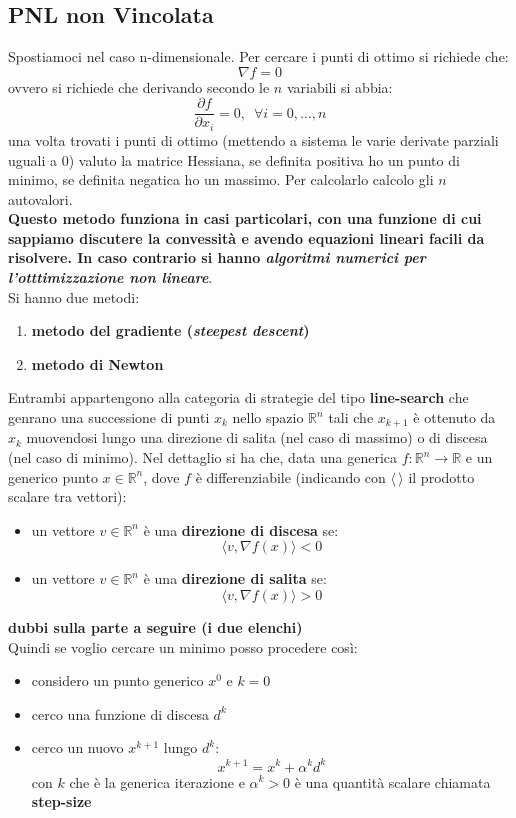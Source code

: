 \message{ !name(ro.tex)}\documentclass[a4paper,12pt, oneside]{book}
\begin{document}
\subsection{PNL non Vincolata}
Spostiamoci nel caso n-dimensionale. Per cercare i punti di ottimo si
richiede che:
\[\nabla f=0\]
ovvero si richiede che derivando secondo le $n$ variabili si abbia:
\[\frac{\partial f}{\partial x_i}=0,\,\,\,\forall i=0,\ldots, n\]
una volta trovati i punti di ottimo (mettendo a sistema le varie
derivate parziali uguali a 0) valuto la matrice Hessiana, se
definita positiva ho un punto di minimo, se definita negatica ho un
massimo. Per calcolarlo calcolo gli $n$ autovalori.\\
\textbf{Questo metodo funziona in casi particolari, con una funzione
  di cui sappiamo discutere la convessità e avendo equazioni lineari
  facili da risolvere. In caso contrario si hanno \textit{algoritmi
    numerici per l'otttimizzazione non lineare}}.\\
Si hanno due metodi:
\begin{enumerate}
  \item \textbf{metodo del gradiente (\textit{steepest descent})}
  \item \textbf{metodo di Newton}
\end{enumerate}
Entrambi appartengono alla categoria di strategie del tipo
\textbf{line-search} che genrano una successione di punti $x_k$ nello
spazio $\mathbb{R}^n$ tali che $x_{k+1}$ è ottenuto da $x_k$
muovendosi lungo una direzione di salita (nel caso di massimo) o di
discesa (nel caso di minimo). Nel dettaglio si ha che, data una generica
$f:\mathbb{R}^n\to\mathbb{R}$ e un generico punto $x\in \mathbb{R}^n$,
dove $f$ è differenziabile (indicando con $\langle\,\rangle$ il
prodotto scalare tra vettori):
\begin{itemize}
  \item un vettore $v\in\mathbb{R}^n$ è una \textbf{direzione di
    discesa} se:
  \[\langle v,\nabla f(x) \rangle<0\]
  \item un vettore $v\in\mathbb{R}^n$ è una \textbf{direzione di
    salita} se:
  \[\langle v,\nabla f(x) \rangle>0\]
\end{itemize}
\newpage
\textbf{dubbi sulla parte a seguire (i due elenchi)\\}
Quindi se voglio cercare un minimo posso procedere così:
\begin{itemize}
  \item considero un punto generico $x^0$ e $k=0$
  \item cerco una funzione di discesa $d^k$
  \item cerco un nuovo $x^{k+1}$ lungo $d^k$:
  \[x^{k+1}=x^k+\alpha^kd^k\]
  con $k$ che è la generica iterazione e $\alpha^k>0$ è una quantità
  scalare chiamata \textbf{step-size} 
\end{itemize}
\end{document}
